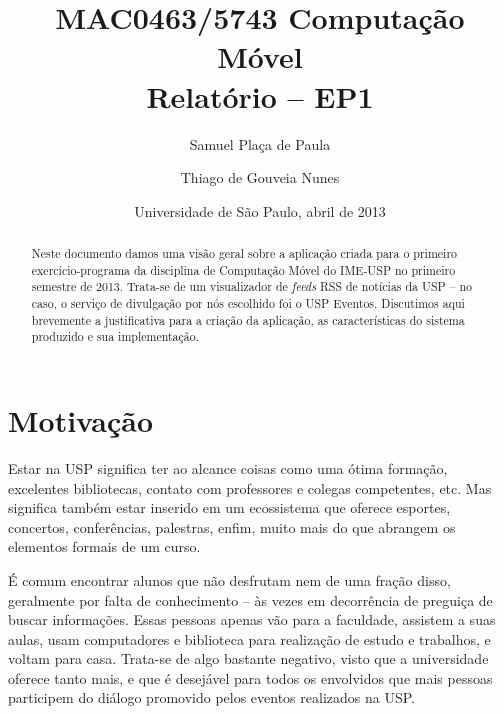 \documentclass[brazil]{article}
\begin{document}
\title{MAC0463/5743 Computação Móvel\\\medskip
    Relatório -- EP1}
\author{Samuel Plaça de Paula
        \and Thiago de Gouveia Nunes}
\date{Universidade de São Paulo, abril de 2013}

\maketitle
\pagestyle{plain}
\footskip=25pt


\begin{abstract}
    Neste documento damos uma visão geral sobre a aplicação criada para o
    primeiro exercício-programa da disciplina de Computação Móvel do IME-USP
    no primeiro semestre de 2013\footnotemark[1].
    Trata-se de um visualizador de \emph{feeds}
    RSS de notícias da USP -- no caso, o serviço de divulgação por nós
    escolhido foi o USP Eventos\footnotemark[2].
    Discutimos aqui brevemente a justificativa para a criação da aplicação,
    as características do sistema produzido e sua implementação.
\end{abstract}




\section{Motivação}
Estar na USP significa ter ao alcance coisas como uma ótima formação,
excelentes bibliotecas, contato com professores e colegas competentes, etc.
Mas significa também estar inserido em um ecossistema que oferece esportes,
concertos, conferências, palestras, enfim, muito mais do que abrangem os
elementos formais de um curso.

É comum encontrar alunos que não desfrutam nem de uma fração disso, geralmente
por falta de conhecimento -- às vezes em decorrência de preguiça de buscar
informações. Essas pessoas apenas vão para a faculdade, assistem a suas aulas,
usam computadores e biblioteca para realização de estudo e trabalhos, e voltam
para casa. Trata-se de algo bastante negativo, visto que a universidade oferece
tanto mais, e que é desejável para todos os envolvidos que mais pessoas
participem do diálogo promovido pelos eventos realizados na USP.
\end{document}
